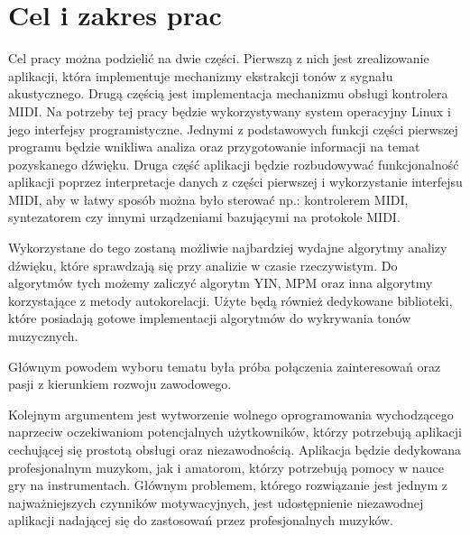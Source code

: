 \chapter{{Cel i zakres prac}}
\label{chapter:Cel}
\thispagestyle{empty}


Cel pracy można podzielić na dwie części. Pierwszą z nich jest zrealizowanie aplikacji, która implementuje mechanizmy ekstrakcji tonów z sygnału akustycznego. Drugą częścią jest implementacja mechanizmu obsługi kontrolera MIDI. Na potrzeby tej pracy będzie wykorzystywany system operacyjny Linux i jego interfejsy programistyczne. Jednymi z podstawowych funkcji części pierwszej programu będzie wnikliwa analiza oraz przygotowanie informacji na temat pozyskanego dźwięku. Druga część aplikacji będzie rozbudowywać funkcjonalność aplikacji poprzez interpretacje danych z części pierwszej i wykorzystanie interfejsu MIDI, aby w łatwy sposób można było sterować np.: kontrolerem MIDI, syntezatorem czy innymi urządzeniami bazującymi na protokole MIDI. 


	
Wykorzystane do tego zostaną możliwie najbardziej wydajne algorytmy analizy dźwięku, które sprawdzają się przy analizie w czasie rzeczywistym. Do algorytmów tych możemy zaliczyć algorytm YIN, MPM oraz inna algorytmy korzystające z metody autokorelacji. Użyte będą również dedykowane biblioteki, które posiadają gotowe implementacji algorytmów do wykrywania tonów muzycznych.

Głównym powodem wyboru  tematu była próba połączenia zainteresowań oraz pasji z kierunkiem rozwoju zawodowego.
	
	
Kolejnym argumentem jest wytworzenie wolnego oprogramowania wychodzącego naprzeciw oczekiwaniom potencjalnych użytkowników, którzy potrzebują aplikacji cechującej się prostotą obsługi oraz niezawodnością. Aplikacja będzie dedykowana profesjonalnym muzykom, jak i amatorom, którzy potrzebują pomocy w nauce gry na instrumentach. Głównym problemem, którego rozwiązanie jest jednym z najważniejszych czynników motywacyjnych, jest udostępnienie niezawodnej aplikacji nadającej się do zastosowań przez profesjonalnych muzyków.